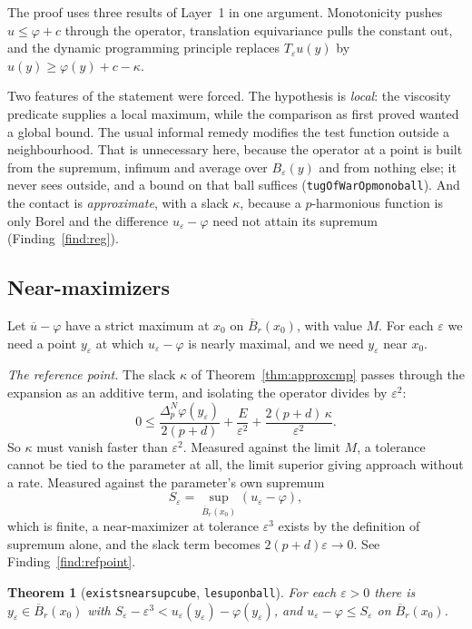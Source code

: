 \documentclass[11pt,reqno]{amsart}
\newcommand{\LEANREF}[1]{\texttt{\small\def\_{\textunderscore\allowbreak}#1}}
\newcommand{\eps}{\varepsilon}
\newcommand{\pnlap}{\Delta_p^{N}}
\newcommand{\Op}{T_\eps}
\theoremstyle{plain}
\newtheorem{theorem}{Theorem}[section]
\theoremstyle{definition}
\begin{document}
The proof uses three results of Layer~1 in one argument. Monotonicity pushes
$u \le \varphi + c$ through the operator, translation equivariance pulls the
constant out, and the dynamic programming principle replaces $\Op u(y)$ by
$u(y) \ge \varphi(y) + c - \kappa$.

Two features of the statement were forced. The hypothesis is \emph{local}: the
viscosity predicate supplies a local maximum, while the comparison as first
proved wanted a global bound. The usual informal remedy modifies the test
function outside a neighbourhood. That is unnecessary here, because the
operator at a point is built from the supremum, infimum and average over
$B_\eps(y)$ and from nothing else; it never sees outside, and a bound on that
ball suffices (\LEANREF{tugOfWarOp\_mono\_ball}). And the contact is
\emph{approximate}, with a slack $\kappa$, because a $p$-harmonious function is
only Borel and the difference $u_\eps - \varphi$ need not attain its supremum
(Finding~\ref{find:reg}).

\subsection{Near-maximizers}\label{ssec:nearmax}

Let $\overline{u} - \varphi$ have a strict maximum at $x_0$ on
$\overline{B}_r(x_0)$, with value $M$. For each $\eps$ we need a point $y_\eps$
at which $u_\eps - \varphi$ is nearly maximal, and we need $y_\eps$ near $x_0$.

\emph{The reference point.} The slack $\kappa$ of Theorem~\ref{thm:approxcmp}
passes through the expansion as an additive term, and isolating the operator
divides by $\eps^2$:
\[
  0 \le \frac{\pnlap\varphi(y_\eps)}{2(p+d)} + \frac{E}{\eps^2}
         + \frac{2(p+d)\,\kappa}{\eps^2}.
\]
So $\kappa$ must vanish faster than $\eps^2$. Measured against the limit $M$, a
tolerance cannot be tied to the parameter at all, the limit superior giving
approach without a rate. Measured against the parameter's own supremum
\[
  S_\eps = \sup_{\overline{B}_r(x_0)} (u_\eps - \varphi),
\]
which is finite, a near-maximizer at tolerance $\eps^3$ exists by the
definition of supremum alone, and the slack term becomes $2(p+d)\eps \to 0$.
See Finding~\ref{find:refpoint}.

\begin{theorem}[\LEANREF{exists\_near\_sup\_cube},
\LEANREF{le\_sup\_on\_ball}]\label{thm:nearsup}
For each $\eps > 0$ there is $y_\eps \in \overline{B}_r(x_0)$ with
$S_\eps - \eps^3 < u_\eps(y_\eps) - \varphi(y_\eps)$, and
$u_\eps - \varphi \le S_\eps$ on $\overline{B}_r(x_0)$.
\end{theorem}
\end{document}
